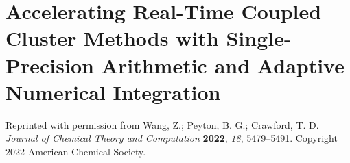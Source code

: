 \chapter{Accelerating Real-Time Coupled Cluster Methods with Single-Precision Arithmetic and Adaptive Numerical Integration} \label{ch-3}
Reprinted with permission from Wang, Z.; Peyton, B. G.; Crawford, T. D. \textit{Journal of Chemical Theory and Computation} \textbf{2022}, \textit{18}, 5479–5491. Copyright 2022 American Chemical Society.





